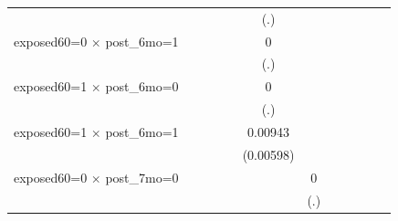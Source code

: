 \begin{table}[htbp]
\begin{tabular}{l*{11}{c}}
                    &                     &                     &                     &                     &         (.)         &                     &                     &                     &                     &                     &                     \\
\addlinespace
exposed60=0 $\times$ post\_6mo=1&                     &                     &                     &                     &           0         &                     &                     &                     &                     &                     &                     \\
                    &                     &                     &                     &                     &         (.)         &                     &                     &                     &                     &                     &                     \\
\addlinespace
exposed60=1 $\times$ post\_6mo=0&                     &                     &                     &                     &           0         &                     &                     &                     &                     &                     &                     \\
                    &                     &                     &                     &                     &         (.)         &                     &                     &                     &                     &                     &                     \\
\addlinespace
exposed60=1 $\times$ post\_6mo=1&                     &                     &                     &                     &     0.00943         &                     &                     &                     &                     &                     &                     \\
                    &                     &                     &                     &                     &   (0.00598)         &                     &                     &                     &                     &                     &                     \\
\addlinespace
exposed60=0 $\times$ post\_7mo=0&                     &                     &                     &                     &                     &           0         &                     &                     &                     &                     &                     \\
                    &                     &                     &                     &                     &                     &         (.)         &                     &                     &                     &                     &                     \\

\end{tabular}
\end{table}
